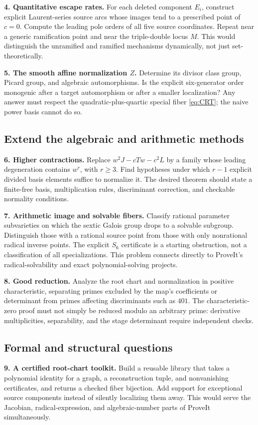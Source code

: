 \documentclass[11pt,a4paper]{article}
\theoremstyle{definition}
\begin{document}
\textbf{4. Quantitative escape rates.} For each deleted component $E_i$,
construct explicit Laurent-series source arcs whose images tend to a
prescribed point of $c=0$. Compute the leading pole orders of all five
source coordinates. Repeat near a generic ramification point and near
the triple-double locus $M$. This would distinguish the unramified and
ramified mechanisms dynamically, not just set-theoretically.

\textbf{5. The smooth affine normalization $Z$.} Determine its divisor
class group, Picard group, and algebraic automorphisms. Is the explicit
six-generator order monogenic after a target automorphism or after a
smaller localization? Any answer must respect the quadratic-plus-quartic
special fiber \eqref{eq:CRT}; the naive power basis cannot do so.

\subsection{Extend the algebraic and arithmetic methods}
\textbf{6. Higher contractions.} Replace $w^2J-cTw-c^2L$ by a family
whose leading degeneration contains $w^r$, with $r\ge3$. Find hypotheses
under which $r-1$ explicit divided basis elements suffice to normalize
it. The desired theorem should state a finite-free basis, multiplication
rules, discriminant correction, and checkable normality conditions.

\textbf{7. Arithmetic image and solvable fibers.} Classify rational
parameter subvarieties on which the sextic Galois group drops to a
solvable subgroup. Distinguish those with a rational source point from
those with only nonrational radical inverse points. The explicit $S_6$
certificate is a starting obstruction, not a classification of all
specializations. This problem connects directly to ProveIt's
radical-solvability and exact polynomial-solving projects.

\textbf{8. Good reduction.} Analyze the root chart and normalization in
positive characteristic, separating primes excluded by the map's
coefficients or determinant from primes affecting discriminants such as
$401$. The characteristic-zero proof must not simply be reduced modulo
an arbitrary prime: derivative multiplicities, separability, and the
stage determinant require independent checks.

\subsection{Formal and structural questions}
\textbf{9. A certified root-chart toolkit.} Build a reusable library that
takes a polynomial identity for a graph, a reconstruction tuple, and
nonvanishing certificates, and returns a checked fiber bijection. Add
support for exceptional source components instead of silently localizing
them away. This would serve the Jacobian, radical-expression, and
algebraic-number parts of ProveIt simultaneously.
\end{document}
